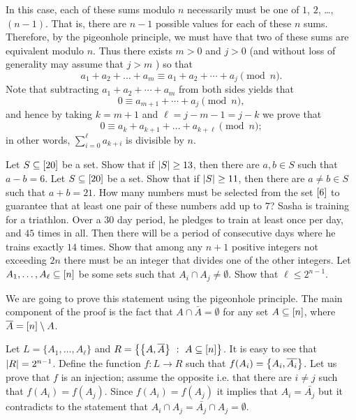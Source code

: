 \begin{chapterendexercises}
\begin{solution}
      In this case, each of these sums modulo $n$ necessarily must be one of
      $1$, $2$, \dots, $(n - 1)$. That is, there are $n - 1$ possible values for
      each of these $n$ sums. Therefore, by the pigeonhole principle, we must
      have that two of these sums are equivalent modulo $n$. Thus there exists
      $m > 0 $ and $j > 0$ (and without loss of generality may assume that $j >
      m$ ) so that 
      \[
        a_1 + a_2 + \dots + a_m \equiv a_1 + a_2 + \cdots + a_j \pmod{n}.
      \]
      Note that subtracting $ a_1 + a_2 + \cdots + a_m$ from both sides yields
      that 
      \[
        0 \equiv
        a_{m + 1} + \cdots + a_{j} \pmod{n},
      \]
      and hence by taking $k = m + 1$ and $\ell = j - m - 1 = j - k $ we prove that 
      \[
        0 \equiv a_k + a_{k + 1} + \dots + a_{k + \ell} \pmod{n};
      \] 
      in other words, $\sum\limits_{i = 0}^\ell a_{k + i}$ is divisible by $n$.
    \end{solution}
  \exercise[recommended] Let $S \subseteq {[{20}]}$ be a set. Show that if
    $\left|{S}\right| \ge 13$, then there are $a, b \in S$ such that $a - b = 6$.
  \exercise Let $S \subseteq {[{20}]}$ be a set. Show that if $\left|{S}\right|
    \ge 11$, then there are $a \neq b \in S$ such that $a + b = 21$.
  \exercise How many numbers must be selected from the set ${[{6}]}$ to
    guarantee that at least one pair of these numbers add up to $7$?
  \exercise Sasha is training for a triathlon. Over a $30$ day period, he
    pledges to train at least once per day, and $45$ times in all. Then there
    will be a period of consecutive days where he trains exactly $14$ times.
  \exercise Show that among any $n + 1$ positive integers not exceeding $2n$
    there must be an integer that divides one of the other integers.
  \exercise Let $A_1, \dots, A_\ell \subseteq {[{n}]}$ be some sets such that
    $A_i \cap A_j \neq \emptyset$. Show that $\ell \le 2^{n - 1}$.
    \begin{solution}
      We are going to prove this statement using the pigeonhole principle. The
      main component of the proof is the fact that $A \cap \bar{A} = \emptyset$
      for any set $A \subseteq {[{n}]}$, where $\overline{A} = {[{n}]} \setminus A$.

      Let $L = \{A_1, \dots, A_\ell\}$ and
      $R = \set[A \subseteq \range{n}]{\set{A, \bar{A}}}$. It is easy to see
      that $\left|{R}\right| = 2^{n - 1}$. Define the function $f : L \to R$ such that 
      $f(A_i) = \set{A_i, \bar{A_i}}$. Let us prove that $f$ is an injection; 
      assume the opposite i.e. that there are $i \neq j$ such that 
      $f(A_i) = f(A_j)$. Since $f(A_i) = f(A_j)$ it implies that $A_i =
      \bar{A_j}$ but it contradicts to the statement that $A_i \cap A_j =
      \bar{A_j} \cap A_j = \emptyset$.


\end{solution}
\end{chapterendexercises}

